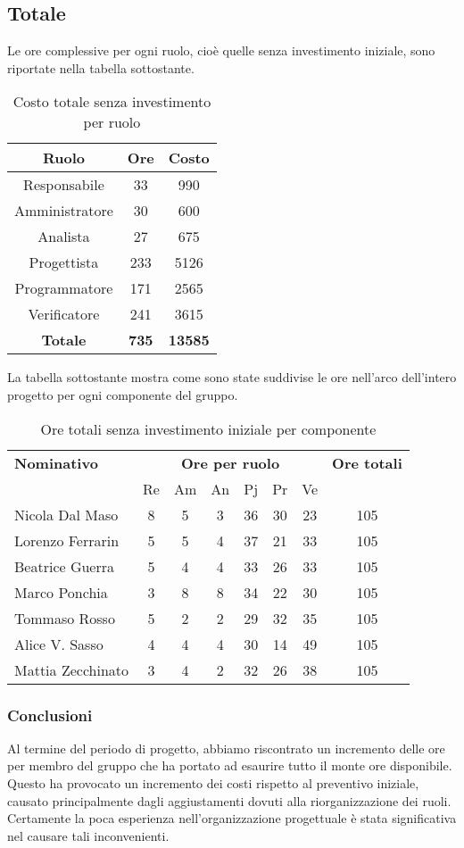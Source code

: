 \subsection{Totale}
Le ore complessive per ogni ruolo, cioè quelle senza investimento iniziale, sono riportate nella tabella sottostante.
\begin{table}[H]
	\centering
	\begin{tabular}{|c|c|c|}
		\hline
		\textbf{Ruolo} &
		\textbf{Ore} &
		\textbf{Costo} \\
		\hline
		Responsabile & 33 & 990\\
		\hline
		Amministratore & 30 & 600\\
		\hline
		Analista & 27 & 675\\
		\hline
		Progettista & 233 & 5126 \\
		\hline
		Programmatore & 171 & 2565 \\
		\hline
		Verificatore & 241 & 3615\\
		\hline
		\textbf{Totale} & \textbf{735} & \textbf{13585} \\
		\hline
	\end{tabular}
	\caption{Costo totale senza investimento per ruolo}
\end{table}

La tabella sottostante mostra come sono state suddivise le ore nell'arco dell'intero progetto per ogni componente del gruppo.
\begin{table}[H]
	\centering
	\begin{tabular}{|l|c|c|c|c|c|c|c|}
		\hline
		\textbf{Nominativo} & 
		\multicolumn{6}{c|}{\textbf{Ore per ruolo}} & 
		\textbf{Ore totali} \\
		& Re & Am & An & Pj & Pr & Ve & \\
		\hline
		Nicola Dal Maso &8 &5 &3 &36 &30 &23 & 105 \\
		Lorenzo Ferrarin &5 &5 &4 &37 &21 &33 & 105 \\
		Beatrice Guerra &5 &4 &4 &33 &26 &33 & 105 \\
		Marco Ponchia &3 &8 &8 &34 &22 &30 & 105 \\
		Tommaso Rosso &5 &2 &2 &29 &32 &35 & 105 \\
		Alice V. Sasso &4 &4 &4 &30 &14 &49 & 105 \\
		Mattia Zecchinato &3 &4 &2 &32 &26 &38 & 105 \\
		\hline
	\end{tabular}
	\caption{Ore totali senza investimento iniziale per componente}
\end{table}

\subsubsection{Conclusioni}
Al termine del periodo di progetto, abbiamo riscontrato un incremento delle ore per membro del gruppo che ha portato ad esaurire tutto il monte ore disponibile. Questo ha provocato un incremento dei costi rispetto al preventivo iniziale, causato principalmente dagli aggiustamenti dovuti alla riorganizzazione dei ruoli. Certamente la poca esperienza nell'organizzazione progettuale è stata significativa nel causare tali inconvenienti.
